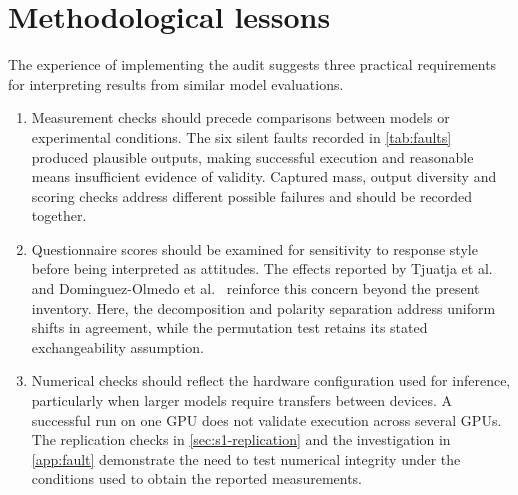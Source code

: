 \section{Methodological lessons}\label{sec:disc-lessons}

The experience of implementing the audit suggests three practical requirements
for interpreting results from similar model evaluations.

\begin{enumerate}[leftmargin=*,itemsep=0.5em]
\item Measurement checks should precede comparisons between models or
experimental conditions. The six silent faults recorded in \cref{tab:faults}
produced plausible outputs, making successful execution and reasonable means
insufficient evidence of validity. Captured mass, output diversity and scoring
checks address different possible failures and should be recorded together.

\item Questionnaire scores should be examined for sensitivity to response
style before being interpreted as attitudes. The effects reported by Tjuatja
et al.\ \cite{tjuatja2024response} and Dominguez-Olmedo et al.\
\cite{dominguez2024questioning} reinforce this concern beyond the present
inventory. Here, the decomposition and polarity separation address uniform
shifts in agreement, while the permutation test retains its stated
exchangeability assumption.

\item Numerical checks should reflect the hardware configuration used for
inference, particularly when larger models require transfers between devices.
A successful run on one GPU does not validate execution across several GPUs.
The replication checks in \cref{sec:s1-replication} and the investigation in
\cref{app:fault} demonstrate the need to test numerical integrity under the
conditions used to obtain the reported measurements.
\end{enumerate}


